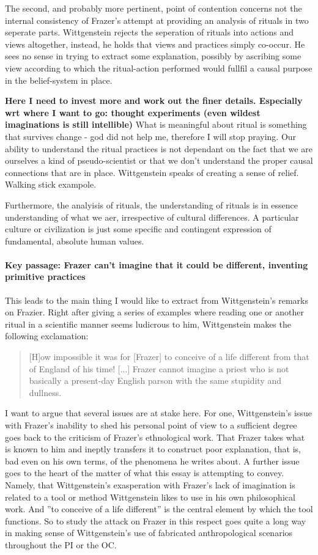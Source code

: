 \documentclass{article}
\begin{document}
The second, and probably more pertinent, point of contention concerns not the internal consistency of Frazer's attempt at providing an analysis of rituals in two seperate parts. Wittgenstein rejects the seperation of rituals into actions and views altogether, instead, he holds that views and practices simply co-occur. He sees no sense in trying to extract some explanation, possibly by ascribing some view according to which the ritual-action performed would fullfil a causal purpose in the belief-system in place.

\textbf{Here I need to invest more and work out the finer details. Especially wrt where I want to go: thought experiments (even wildest imaginations is still intellible)}
What is meaningful about ritual is something that survives change - god did not help me, therefore I will stop praying. Our ability to understand the ritual practices is not dependant on the fact that we are ourselves a kind of pseudo-scientist or that we don't understand the proper causal connections that are in place. Wittgenstein speaks of creating a sense of relief. Walking stick exampole. 

Furthermore, the analyisis of rituals, the understanding of rituals is in essence understanding of what we aer, irrespective of cultural differences. A particular culture or civilization is just some specific and contingent expression of fundamental, absolute human values.

\paragraph{Key passage: Frazer can't imagine that it could be different, inventing primitive practices}
This leads to the main thing I would like to extract from Wittgenstein's remarks on Frazier. Right after giving a series of examples where reading one or another ritual  in a scientific manner seems ludicrous to him, Wittgenstein makes the following exclamation:
\begin{quote}
[H]ow impossible it was for [Frazer] to conceive of a life different from that of England of his time! [...] Frazer cannot imagine a priest who is not basically a present-day English parson with the same stupidity and dullness.
\end{quote}
I want to argue that several issues are at stake here. For one, Wittgenstein's issue with Frazer's inability to shed his personal point of view to a sufficient degree goes back to the criticism of Frazer's ethnological work. That Frazer takes what is known to him and ineptly transfers it to construct poor explanation, that is, bad even on his own terms, of the phenomena he writes about. A further issue goes to the heart of the matter of what this essay is attempting to convey. Namely, that Wittgenstein's exasperation with Frazer's lack of imagination is related to a tool or method Wittgenstein likes to use in his own philosophical work. And ''to conceive of a life different'' is the central element by which the tool functions. So to study the attack on Frazer in this respect goes quite a long way in making sense of Wittgenstein's use of fabricated anthropological scenarios throughout the PI or the OC. 
 
\end{document}
